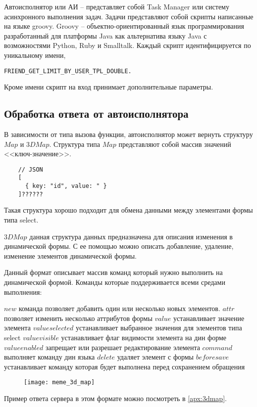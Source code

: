 \documentclass[../index.tex]{subfiles}
\begin{document}
Автоисполнятор или АИ -- представляет собой Task Manager или систему асинхронного выполнения задач. 
Задачи представляют собой скрипты написанные на языке groovy. 
Groovy -- объектно-ориентированный язык программирования разработанный для платформы 
Java как альтернатива языку Java с возможностями Python, Ruby и Smalltalk. 
Каждый скрипт идентифицируется по уникальному имени,
\begin{verbatim}
FRIEND_GET_LIMIT_BY_USER_TPL_DOUBLE. 
\end{verbatim}

Кроме имени скрипт на вход принимает дополнительные параметры. 

\subsection{Обработка ответа от автоисполнятора}

В зависимости от типа вызова функции, автоисполнятор может вернуть структуру $Map$ и $3DMap$.
Структура типа $Map$ представляют собой массив значений <<ключ-значение>>.

\begin{verbatim}
    // JSON 
    [
      { key: "id", value: " }
    ]??????
\end{verbatim}

Такая структура хорошо подходит для обмена данными между элементами формы типа select.

$3DMap$ данная структура данных предназначена для описания изменения в динамической формы.
С ее помощью можно описать добавление, удаление, изменение элементов динамической формы.

Данный формат описывает массив команд который нужно выполнить на динамической формой.
Команды которые поддерживается всеми средами выполнения:

$new$ команда позволяет добавить один или несколько новых элементов.
$attr$ позволяет изменить несколько аттрибутов формы
$value$ устанавливает значение элемента
$valueselected$ устанавливает выбранное значения для элементов типа select
$valuevisible$ устанавливает флаг видимости элемента на дин форме
$valueenabled$ запрещает или разрешает редактирование элемента
$command$ выполняет команду дин языка
$delete$ удаляет элемент с формы
$beforesave$ устанавливает команду которая будет выполнена перед сохранением обращения

\begin{figure}[h]
	\texttt{[image: meme\_3d\_map]}
	\centering
\end{figure}


Пример ответа сервера в этом формате можно посмотреть в \autoref{apx:3dmap}.
\end{document}
